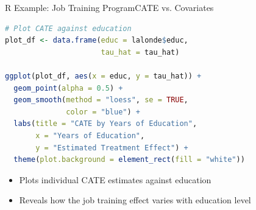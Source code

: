 \documentclass[dvipsnames,hyperref={pdfpagelabels=false}]{beamer}
\begin{document}
\begin{frame}[fragile]{R Example: Job Training Program}{CATE vs. Covariates}
\begin{lstlisting}[language=R]
# Plot CATE against education
plot_df <- data.frame(educ = lalonde$educ,
                      tau_hat = tau_hat)

ggplot(plot_df, aes(x = educ, y = tau_hat)) +
  geom_point(alpha = 0.5) +
  geom_smooth(method = "loess", se = TRUE,
              color = "blue") +
  labs(title = "CATE by Years of Education",
       x = "Years of Education",
       y = "Estimated Treatment Effect") +
  theme(plot.background = element_rect(fill = "white"))
\end{lstlisting}
	\begin{itemize}
		\item Plots individual CATE estimates against education
		\vspace{0.2cm}
		\item Reveals how the job training effect varies with education level
	\end{itemize}
\end{frame}
\end{document}
